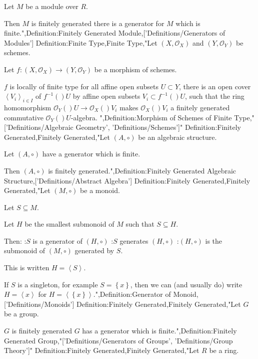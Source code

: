 Let $M$ be a module over $R$.


Then $M$ is finitely generated  there is a generator for $M$ which is finite.",Definition:Finitely Generated Module,['Definitions/Generators of Modules']
Definition:Finite Type,Finite Type,"Let $\left( X, \mathcal O_X \right)$ and $\left( Y, \mathcal O_Y \right)$ be schemes.

Let $f : \left( X, \mathcal O_X \right) \to \left( Y, \mathcal O_Y \right)$ be a morphism of schemes.


$f$ is locally of finite type  for all affine open subsets $U \subset Y$, there is an open cover $\left\langle V_i \right\rangle_{i \mathop \in I}$ of $f^{-1}  \left(   \right)U$ by affine open subsets $V_i \subset f^{-1}  \left(   \right)U$, such that the ring homomorphism $\mathcal O_Y \left(   \right)U \to \mathcal O_X \left(   \right){V_i}$ makes $\mathcal O_X \left(   \right){V_i}$ a finitely generated commutative $\mathcal O_Y \left(   \right)U$-algebra.
",Definition:Morphism of Schemes of Finite Type,"['Definitions/Algebraic Geometry', 'Definitions/Schemes']"
Definition:Finitely Generated,Finitely Generated,"Let $\left( A, \circ \right)$ be an algebraic structure.

Let $\left( A, \circ \right)$ have a generator which is finite.


Then $\left( A, \circ \right)$ is finitely generated.",Definition:Finitely Generated Algebraic Structure,['Definitions/Abstract Algebra']
Definition:Finitely Generated,Finitely Generated,"Let $\left( M, \circ \right)$ be a monoid.

Let $S \subseteq M$.

Let $H$ be the smallest submonoid of $M$ such that $S \subseteq H$.


Then:
:$S$ is a generator of $\left( H, \circ \right)$
:$S$ generates $\left( H, \circ \right)$
:$\left( H, \circ \right)$ is the submonoid of $\left( M, \circ \right)$ generated by $S$.


This is written $H = {\left\langle S \right\rangle}$.


If $S$ is a singleton, for example $S = \left\lbrace x \right\rbrace$, then we can (and usually do) write $H = {\left\langle x \right\rangle}$ for $H = {\left\langle \left\lbrace x \right\rbrace \right\rangle}$.",Definition:Generator of Monoid,['Definitions/Monoids']
Definition:Finitely Generated,Finitely Generated,"Let $G$ be a group.


$G$ is finitely generated  $G$ has a generator which is finite.",Definition:Finitely Generated Group,"['Definitions/Generators of Groups', 'Definitions/Group Theory']"
Definition:Finitely Generated,Finitely Generated,"Let $R$ be a ring.

